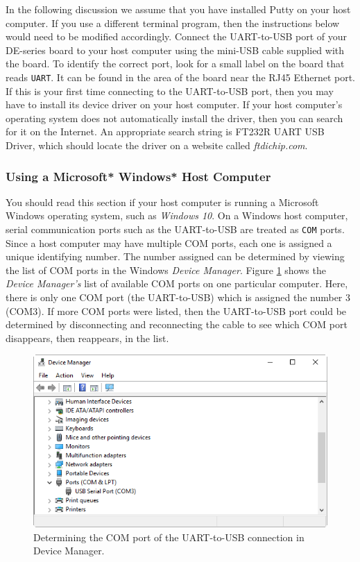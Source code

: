 \documentclass[11pt, twoside, pdftex]{article}
\begin{document}
In the following discussion we assume that you have installed Putty on your host computer.
If you use a different terminal program, then the instructions below
would need to be modified accordingly. Connect the UART-to-USB port of your DE-series board 
to your host computer using the mini-USB cable supplied with the board. To identify the
correct port, look for a small label on the board that reads \texttt{UART}. It can be found 
in the area of the board near the RJ45 Ethernet port. If this is your first time connecting to 
the UART-to-USB port, then you may have to install its device driver on your host computer. If 
your host computer's operating system does not automatically install the driver, then you 
can search for it on the Internet. An appropriate search string is {\sf FT232R UART USB 
Driver}, which should locate the driver on a website called {\it ftdichip.com}.

\subsubsection{Using a Microsoft* Windows* Host Computer}

You should read this section if your host computer is running a Microsoft Windows
operating system, such as {\it Windows 10}. 
On a Windows host computer, serial communication ports such as the UART-to-USB 
are treated as \texttt{COM} ports. Since a host computer may have multiple COM ports, 
each one is assigned a unique identifying number. The number assigned can be 
determined by viewing the list of COM ports in the Windows
\textit{Device Manager}. Figure \ref{fig:putty_0} shows the \textit{Device Manager's} list of 
available COM ports on one particular computer. Here, there is only one COM port (the UART-to-USB)
which is assigned the number 3 (COM3). If more COM ports were listed, then the UART-to-USB
port could be determined by disconnecting and reconnecting the cable to see which COM port 
disappears, then reappears, in the list.

\begin{figure}[H]
   \begin{center}
       \includegraphics[scale=0.7]{figures/fig_putty_tut_0}
   \end{center}
   \caption{Determining the COM port of the UART-to-USB connection in Device Manager.}
	\label{fig:putty_0}
\end{figure}
\end{document}
